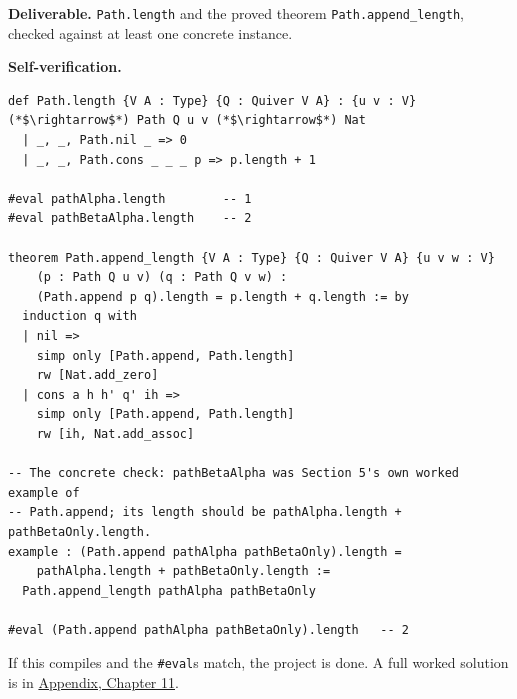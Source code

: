 \begin{pblproject}
\textbf{Deliverable.} \texttt{Path.length} and the proved theorem \texttt{Path.append\_\allowbreak{}length}, checked against at least one concrete instance.

\textbf{Self-verification.}

\begin{lstlisting}
def Path.length {V A : Type} {Q : Quiver V A} : {u v : V} (*$\rightarrow$*) Path Q u v (*$\rightarrow$*) Nat
  | _, _, Path.nil _ => 0
  | _, _, Path.cons _ _ _ p => p.length + 1

#eval pathAlpha.length        -- 1
#eval pathBetaAlpha.length    -- 2

theorem Path.append_length {V A : Type} {Q : Quiver V A} {u v w : V}
    (p : Path Q u v) (q : Path Q v w) :
    (Path.append p q).length = p.length + q.length := by
  induction q with
  | nil =>
    simp only [Path.append, Path.length]
    rw [Nat.add_zero]
  | cons a h h' q' ih =>
    simp only [Path.append, Path.length]
    rw [ih, Nat.add_assoc]

-- The concrete check: pathBetaAlpha was Section 5's own worked example of
-- Path.append; its length should be pathAlpha.length + pathBetaOnly.length.
example : (Path.append pathAlpha pathBetaOnly).length =
    pathAlpha.length + pathBetaOnly.length :=
  Path.append_length pathAlpha pathBetaOnly

#eval (Path.append pathAlpha pathBetaOnly).length   -- 2
\end{lstlisting}

If this compiles and the \texttt{\#eval}s match, the project is done. A full worked solution is in \hyperref[sec:14-appendix-solutions:10-chapter-11:1]{Appendix, Chapter 11}.

\end{pblproject}
